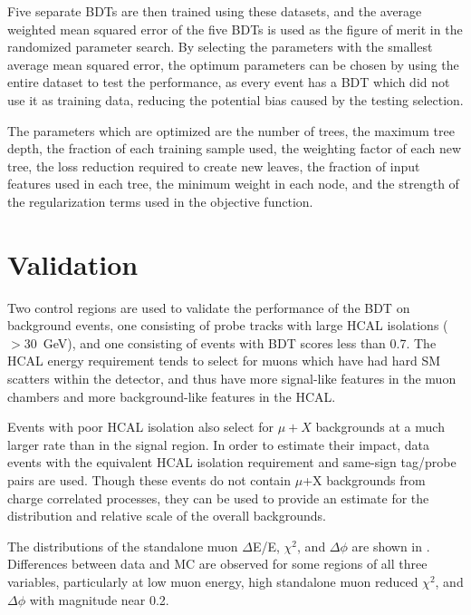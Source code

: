 Five separate BDTs are then trained using these datasets, and the average weighted mean squared error of the five BDTs is used as the figure of merit in the randomized parameter search.
By selecting the parameters with the smallest average mean squared error, the optimum parameters can be chosen by using the entire dataset to test the performance, as every event has a BDT which did not use it as training data, reducing the potential bias caused by the testing selection.

The parameters which are optimized are the number of trees, the maximum tree depth, the fraction of each training sample used, the weighting factor of each new tree, the loss reduction required to create new leaves, the fraction of input features used in each tree, the minimum weight in each node, and the strength of the regularization terms used in the objective function.

\section{Validation}
\label{sec:BDTvalid}
Two control regions are used to validate the performance of the BDT on background events, one consisting of probe tracks with large HCAL isolations ($>$\SI{30}{\giga\eV}), and one consisting of events with BDT scores less than 0.7. 
The HCAL energy requirement tends to select for muons which have had hard SM scatters within the detector, and thus have more signal-like features in the muon chambers and more background-like features in the HCAL.

Events with poor HCAL isolation also select for $\mu+X$ backgrounds at a much larger rate than in the signal region.
In order to estimate their impact, data events with the equivalent HCAL isolation requirement and same-sign tag/probe pairs are used.
Though these events do not contain $\mu$+X backgrounds from charge correlated processes, they can be used to provide an estimate for the distribution and relative scale of the overall backgrounds.

The distributions of the standalone muon $\Delta$E/E, $\chi^{2}$, and $\Delta\phi$ are shown in . 
Differences between data and MC are observed for some regions of all three variables, particularly at low muon energy, high standalone muon reduced $\chi^{2}$, and $\Delta\phi$ with magnitude near 0.2. 

